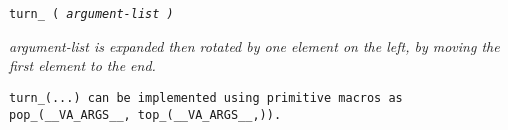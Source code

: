 
\tt{turn_ (} \it{argument-list} \tt{)}


\it{argument-list} is expanded then rotated by one element on the left,
by moving the first element to the end.

\note \tt{turn_(...)} can be implemented using primitive
macros as \tt{pop_(__VA_ARGS__, top_(__VA_ARGS__,))}.
